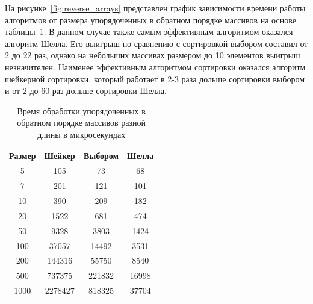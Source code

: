\documentclass[12pt]{report}
\begin{document}
    На рисунке~\ref{fig:reverse_arrays} представлен график зависимости времени работы алгоритмов
    от размера упорядоченных в обратном порядке массивов на основе таблицы~\ref{tab:kontr_time}.
    В данном случае также самым эффективным алгоритмом оказался алгоритм Шелла.
    Его выигрыш по сравнению с сортировкой выбором составил от 2 до 22 раз,
    однако на небольших массивах размером до 10 элементов выигрыш незначителен.
    Наименее эффективным алгоритмом сортировки оказался алгоритм шейкерной сортировки,
    который работает в 2-3 раза дольше сортировки выбором и от 2 до 60 раз дольше сортировки Шелла.
    \begin{table}[H]
        \begin{center}
            \captionsetup{justification=raggedright, singlelinecheck=false}
            \caption{\label{tab:kontr_time} Время обработки упорядоченных в обратном порядке массивов разной длины в микросекундах}
            \begin{tabular}{|c c c c|}
                \hline
                Размер & Шейкер  & Выбором & Шелла\\ [0.5ex]
                \hline
                5      & 105     & 73      & 68    \\
                \hline
                7      & 201     & 121     & 101   \\
                \hline
                10     & 390     & 209     & 182   \\
                \hline
                20     & 1522    & 681     & 474   \\
                \hline
                50     & 9328    & 3803    & 1424  \\
                \hline
                100    & 37057   & 14492   & 3531  \\
                \hline
                200    & 144316  & 55750   & 8540  \\
                \hline
                500    & 737375  & 221832  & 16998 \\
                \hline
                1000   & 2278427 & 818325  & 37704 \\
                \hline
            \end{tabular}
        \end{center}
    \end{table}
\end{document}
